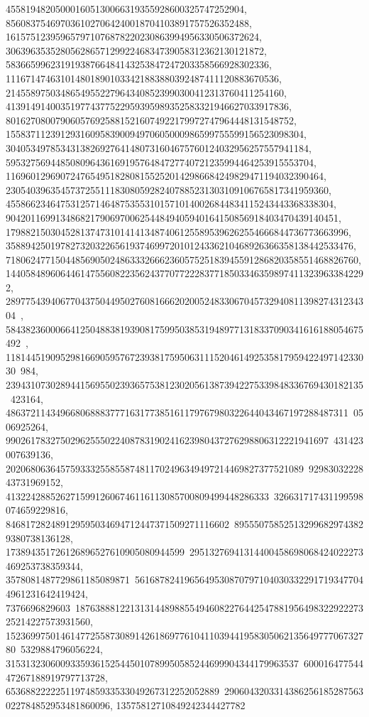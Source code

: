 {{{   455819482050001605130066319355928600325747252904, 
   8560837546970361027064240018704103891757526352488, 
   161575123959657971076878220230863994956330506372624, 
   3063963535280562865712992246834739058312362130121872, 
   58366599623191938766484143253847247203358566928302336, 
   1116714746310148018901033421883880392487411120883670536, 
   21455897503486549552279643408523990300412313760411254160, 
   413914914003519774377522959395989352583321946627033917836, 
   8016270800790605769258815216074922179972747964448131548752, 
   155837112391293160958390094970605000986599755599156523098304, 
   3040534978534313826927641480731604675760124032956257557941184, 
   59532756944850809643616919576484727740721235994464253915553704, 
   1169601296907247654951828081552520142986684249829471194032390464, 
   23054039635457372551118308059282407885231303109106765817341959360, 
   455866234647531257146487535531015710140026844834115243443368338304, 
   9042011699134868217906970062544849405940164150856918403470439140451, 
   179882150304528137473101414134874061255895396262554666844736773663996, 
   3588942501978273203226561937469972010124336210468926366358138442533476, 
   71806247715044856905024863332666236057525183945591286820358551468826760, 
   1440584896064461475560822356243770772228377185033463598974113239633842292, 
   28977543940677043750449502760816662020052483306704573294081139827431234304\
, 
   584382360006641250488381939081759950385319489771318337090341616188054675492\
, 
   11814451909529816690595767239381759506311152046149253581795942249714233030\
984, 239431073028944156955023936575381230205613873942275339848336769430182135\
423164, 486372114349668068883777163177385161179767980322644043467197288487311\
0506925264, 99026178327502962555022408783190241623980437276298806312221941697\
431423007639136, 202068063645759333255855874811702496349497214469827377521089\
9298303222843731969152, 41322428852627159912606746116113085700809499448286333\
326631717431199598074659229816, 846817282489129595034694712447371509271116602\
895550758525132996829743829380738136128, 173894351726126896527610905080944599\
29513276941314400458698068424022273469253738359344, 3578081487729861185089871\
56168782419656495308707971040303322917193477044961231642419424, 7376696829603\
187638881221313144898855494608227644254788195649832292227325214227573931560, 
   15236997501461477255873089142618697761041103944195830506213564977706732780\
5329884796056224, 31531323060093359361525445010789950585244699904344179963537\
60001647754447267188919797713728, 6536882222251197485933533049267312252052889\
2906043203314386256185287563022784852953481860096, 13575812710849242344427782\
}}}
